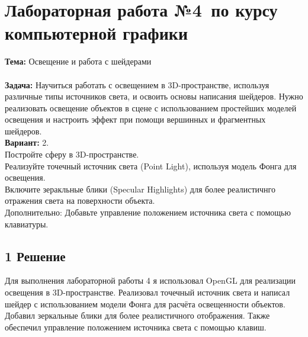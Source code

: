 \documentclass[12pt]{article}
\begin{document}




\section*{Лабораторная работа №4\, по курсу компьютерной графики}

\textbf{Тема:} Освещение и работа с шейдерами\\
\\
\textbf{Задача:} Научиться работать с освещением в 3D-пространстве, используя различные типы источников света, и освоить основы написания шейдеров. 
Нужно реализовать освещение объектов в сцене с использованием простейших моделей освещения и настроить эффект при помощи вершинных и фрагментных шейдеров.\\
\textbf{Вариант:} 2. \\
Постройте сферу в 3D-пространстве.\\
Реализуйте точечный источник света (Point Light), используя модель Фонга для освещения.\\
Включите зеракльные блики (Specular Highlights) для более реалистичнго отражения света на поверхности объекта.\\
Дополнительно: Добавьте управление положением источника света с помощью клавиатуры.\\

\subsection*{1 Решение}
Для выполнения лабораторной работы 4 я использовал OpenGL для реализации освещения в 3D-пространстве. 
Реализовал точечный источник света и написал шейдер с использованием модели Фонга для расчёта освещенности объектов. 
Добавил зеркальные блики для более реалистичного отображения. 
Также обеспечил управление положением источника света с помощью клавиш.
\end{document}
